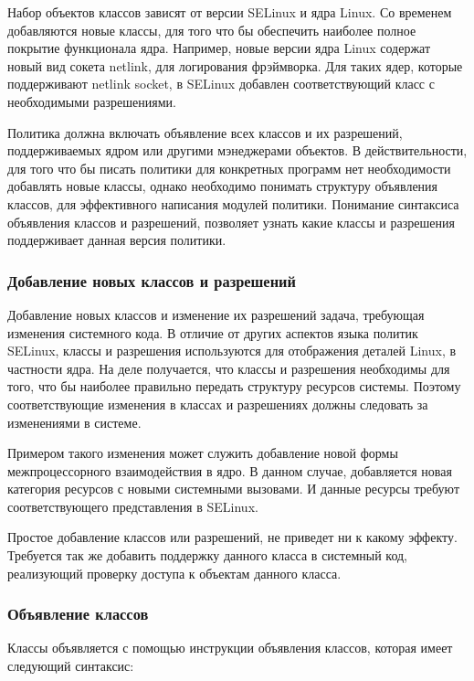 \documentclass{./../class/UIR}
\begin{document}
	Набор объектов классов зависят от версии SELinux и ядра Linux. Со временем
	добавляются новые классы, для того что бы обеспечить наиболее полное покрытие
	функционала ядра. Например, новые версии ядра Linux содержат новый вид сокета
	netlink, для логирования фрэймворка. Для таких ядер, которые поддерживают	
	netlink socket, в SELinux добавлен соответствующий класс с необходимыми
	разрешениями.
	
	Политика должна включать объявление всех классов и их разрешений,
	поддерживаемых ядром или другими мэнеджерами объектов. В действительности, для
	того что бы писать политики для конкретных программ нет необходимости
	добавлять новые классы, однако необходимо понимать структуру объявления
	классов, для эффективного написания модулей политики. Понимание синтаксиса
	объявления классов и разрешений, позволяет узнать какие классы и разрешения
	поддерживает данная версия политики.
    
    \subsubsection{Добавление новых классов и разрешений}
    Добавление новых классов и изменение их разрешений задача, требующая
    изменения системного кода. В отличие от других аспектов языка политик
    SELinux, классы и разрешения используются для отображения деталей Linux, в
    частности ядра. На деле получается, что классы и разрешения необходимы для
  того, что бы наиболее правильно передать структуру ресурсов системы. Поэтому
    соответствующие изменения в классах и разрешениях должны следовать за
    изменениями в системе.

 Примером такого изменения может служить добавление новой формы межпроцессорного
 взаимодействия в ядро. В данном случае,  добавляется новая категория ресурсов с
 новыми системными вызовами. И данные ресурсы требуют соответствующего
 представления в SELinux.

 Простое добавление классов или разрешений, не приведет ни к какому эффекту.
 Требуется так же добавить поддержку данного класса в системный код, реализующий
 проверку доступа к объектам данного класса.
     
    \subsubsection{Объявление классов}
    Классы объявляется с помощью инструкции объявления классов, которая имеет
    следующий синтаксис:
    
\end{document}
